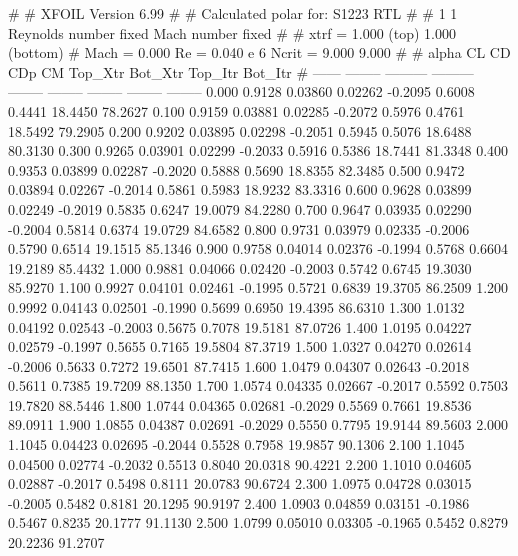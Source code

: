 #  
#       XFOIL         Version 6.99
#  
# Calculated polar for: S1223 RTL                                       
#  
# 1 1 Reynolds number fixed          Mach number fixed         
#  
# xtrf =   1.000 (top)        1.000 (bottom)  
# Mach =   0.000     Re =     0.040 e 6     Ncrit =   9.000  9.000
#  
#   alpha    CL        CD       CDp       CM     Top_Xtr  Bot_Xtr  Top_Itr  Bot_Itr
#  ------ -------- --------- --------- -------- -------- -------- -------- --------
   0.000   0.9128   0.03860   0.02262  -0.2095   0.6008   0.4441  18.4450  78.2627
   0.100   0.9159   0.03881   0.02285  -0.2072   0.5976   0.4761  18.5492  79.2905
   0.200   0.9202   0.03895   0.02298  -0.2051   0.5945   0.5076  18.6488  80.3130
   0.300   0.9265   0.03901   0.02299  -0.2033   0.5916   0.5386  18.7441  81.3348
   0.400   0.9353   0.03899   0.02287  -0.2020   0.5888   0.5690  18.8355  82.3485
   0.500   0.9472   0.03894   0.02267  -0.2014   0.5861   0.5983  18.9232  83.3316
   0.600   0.9628   0.03899   0.02249  -0.2019   0.5835   0.6247  19.0079  84.2280
   0.700   0.9647   0.03935   0.02290  -0.2004   0.5814   0.6374  19.0729  84.6582
   0.800   0.9731   0.03979   0.02335  -0.2006   0.5790   0.6514  19.1515  85.1346
   0.900   0.9758   0.04014   0.02376  -0.1994   0.5768   0.6604  19.2189  85.4432
   1.000   0.9881   0.04066   0.02420  -0.2003   0.5742   0.6745  19.3030  85.9270
   1.100   0.9927   0.04101   0.02461  -0.1995   0.5721   0.6839  19.3705  86.2509
   1.200   0.9992   0.04143   0.02501  -0.1990   0.5699   0.6950  19.4395  86.6310
   1.300   1.0132   0.04192   0.02543  -0.2003   0.5675   0.7078  19.5181  87.0726
   1.400   1.0195   0.04227   0.02579  -0.1997   0.5655   0.7165  19.5804  87.3719
   1.500   1.0327   0.04270   0.02614  -0.2006   0.5633   0.7272  19.6501  87.7415
   1.600   1.0479   0.04307   0.02643  -0.2018   0.5611   0.7385  19.7209  88.1350
   1.700   1.0574   0.04335   0.02667  -0.2017   0.5592   0.7503  19.7820  88.5446
   1.800   1.0744   0.04365   0.02681  -0.2029   0.5569   0.7661  19.8536  89.0911
   1.900   1.0855   0.04387   0.02691  -0.2029   0.5550   0.7795  19.9144  89.5603
   2.000   1.1045   0.04423   0.02695  -0.2044   0.5528   0.7958  19.9857  90.1306
   2.100   1.1045   0.04500   0.02774  -0.2032   0.5513   0.8040  20.0318  90.4221
   2.200   1.1010   0.04605   0.02887  -0.2017   0.5498   0.8111  20.0783  90.6724
   2.300   1.0975   0.04728   0.03015  -0.2005   0.5482   0.8181  20.1295  90.9197
   2.400   1.0903   0.04859   0.03151  -0.1986   0.5467   0.8235  20.1777  91.1130
   2.500   1.0799   0.05010   0.03305  -0.1965   0.5452   0.8279  20.2236  91.2707
